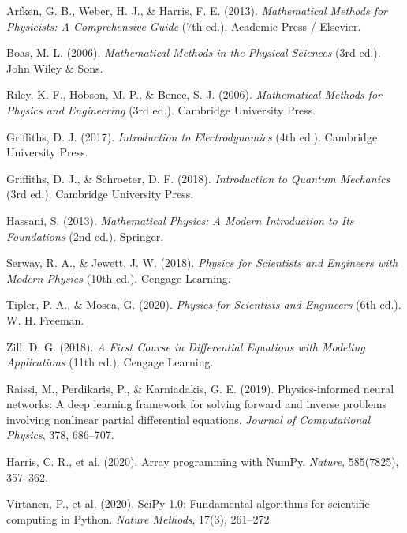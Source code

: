 \begin{enumerate}[label={[\arabic*]}, leftmargin=2.5em, itemsep=7pt]
    \item Arfken, G. B., Weber, H. J., \& Harris, F. E. (2013). \textit{Mathematical Methods for Physicists: A Comprehensive Guide} (7th ed.). Academic Press / Elsevier.
    \item Boas, M. L. (2006). \textit{Mathematical Methods in the Physical Sciences} (3rd ed.). John Wiley \& Sons.
    \item Riley, K. F., Hobson, M. P., \& Bence, S. J. (2006). \textit{Mathematical Methods for Physics and Engineering} (3rd ed.). Cambridge University Press.
    \item Griffiths, D. J. (2017). \textit{Introduction to Electrodynamics} (4th ed.). Cambridge University Press.
    \item Griffiths, D. J., \& Schroeter, D. F. (2018). \textit{Introduction to Quantum Mechanics} (3rd ed.). Cambridge University Press.
    \item Hassani, S. (2013). \textit{Mathematical Physics: A Modern Introduction to Its Foundations} (2nd ed.). Springer.
    \item Serway, R. A., \& Jewett, J. W. (2018). \textit{Physics for Scientists and Engineers with Modern Physics} (10th ed.). Cengage Learning.
    \item Tipler, P. A., \& Mosca, G. (2020). \textit{Physics for Scientists and Engineers} (6th ed.). W. H. Freeman.
    \item Zill, D. G. (2018). \textit{A First Course in Differential Equations with Modeling Applications} (11th ed.). Cengage Learning.
    \item Raissi, M., Perdikaris, P., \& Karniadakis, G. E. (2019). Physics-informed neural networks: A deep learning framework for solving forward and inverse problems involving nonlinear partial differential equations. \textit{Journal of Computational Physics}, 378, 686--707.
    \item Harris, C. R., et al. (2020). Array programming with NumPy. \textit{Nature}, 585(7825), 357--362.
    \item Virtanen, P., et al. (2020). SciPy 1.0: Fundamental algorithms for scientific computing in Python. \textit{Nature Methods}, 17(3), 261--272.
\end{enumerate}
